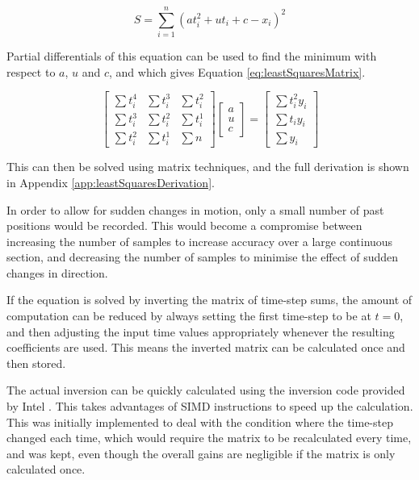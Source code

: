 \documentclass[10pt]{article}
\begin{document}
\begin{equation}
  S = \sum_{i=1}^n (a t_i^2+ u t_i + c - x_i)^2 
  \label{eq:leastSquaresEq}
\end{equation}

Partial differentials of this equation can be used to find the minimum with
respect to $a$, $u$ and $c$, and which gives Equation
\ref{eq:leastSquaresMatrix}.

\begin{equation}
  \left[
   \begin{matrix}
    \sum t_i^4 & \sum t_i^3 & \sum t_i^2 \\
    \sum t_i^3 & \sum t_i^2 & \sum t_i^1 \\
    \sum t_i^2 & \sum t_i^1 & \sum n
   \end{matrix}
  \right]
  \left[
   \begin{matrix}
    a \\
    u \\
    c
   \end{matrix}
  \right]
  =
  \left[
   \begin{matrix}
    \sum t_i^2 y_i \\
    \sum t_i y_i \\
    \sum y_i
   \end{matrix}
  \right]
  \label{eq:leastSquaresMatrix}
\end{equation}

This can then be solved using matrix techniques, and the full derivation is
shown in Appendix \ref{app:leastSquaresDerivation}.

In order to allow for sudden changes in motion, only a small number of past
positions would be recorded.  This would become a compromise between increasing
the number of samples to increase accuracy over a large continuous section, and
decreasing the number of samples to minimise the effect of sudden changes in
direction.

If the equation is solved by inverting the matrix of time-step sums, the amount
of computation can be reduced by always setting the first time-step to be at
$t=0$, and then adjusting the input time values appropriately whenever the
resulting coefficients are used.  This means the inverted matrix can be
calculated once and then stored.

The actual inversion can be quickly calculated using the inversion code provided
by Intel \cite{intelMatrixInverse}.  This takes advantages of SIMD instructions
to speed up the calculation.  This was initially implemented to deal with the
condition where the time-step changed each time, which would require the matrix
to be recalculated every time, and was kept, even though the overall gains are
negligible if the matrix is only calculated once.
\end{document}
